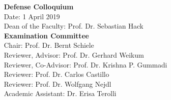 \newpage
\noindent
\textbf{Defense Colloquium} \\[0.25cm]
Date: \hspace{3.2cm}1 April 2019\\[1cm]
Dean of the Faculty: \hspace{0.88cm}Prof. Dr. Sebastian Hack \\[2.5cm]
%
\textbf{Examination Committee} \\[0.25cm]
Chair: \hspace{3.1cm}Prof. Dr. Bernt Schiele\\[1.0cm]%
%
Reviewer, Advisor: \hspace{1.05cm} Prof. Dr. Gerhard Weikum\\[1.0cm]
%
Reviewer, Co-Advisor: \hspace{0.55cm} Prof. Dr. Krishna P. Gummadi\\[1.0cm]
%
Reviewer: \hspace{2.50cm} Prof. Dr. Carlos Castillo\\[1.0cm]
%
Reviewer: \hspace{2.50cm} Prof. Dr. Wolfgang Nejdl\\[1.0cm]
%
Academic Assistant: \hspace{0.92cm} Dr. Erisa Terolli\\[1.0cm]%

\cleardoublepage

%

\cleardoublepage



